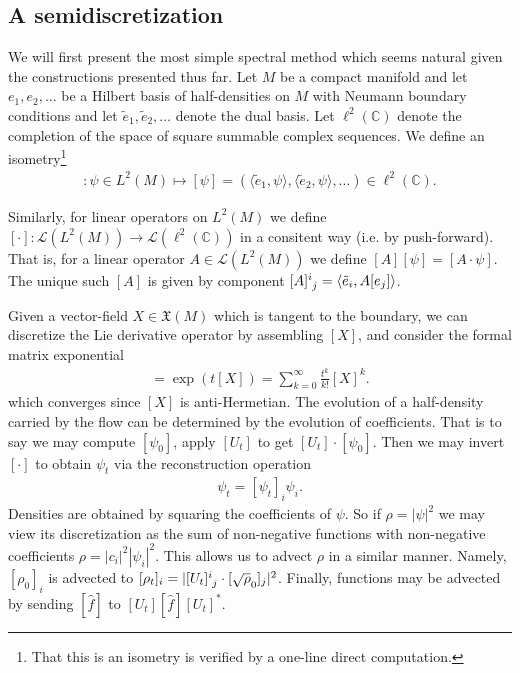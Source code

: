 \documentclass[12pt]{amsart}
\begin{document}
\subsection{A semidiscretization}
\label{sec:semi_discretization}

We will first present the most simple spectral method
which seems natural given the constructions presented thus far.
Let $M$ be a compact manifold and let
$e_1,e_2,\dots$ be a Hilbert basis of half-densities
on $M$ with Neumann boundary conditions
and let $\tilde{e}_1,\tilde{e}_2,\dots$ denote the dual basis.
Let $\ell^2( \mathbb{C})$ denote the completion of the space of square summable complex sequences.
We define an isometry\footnote{That this is an isometry is verified by a one-line direct computation.}
\begin{align*}
  [\cdot ] : \psi \in L^2(M) \mapsto [\psi] = ( \langle \tilde{e}_1 , \psi \rangle, \langle \tilde{e}_2, \psi \rangle, \dots ) \in \ell^2( \mathbb{C}).
\end{align*}

Similarly, for linear operators on $L^2(M)$ we define $[\cdot ]: \mathcal{L}( L^2(M) ) \to \mathcal{L}( \ell^2( \mathbb{C}) )$ in a consitent way (i.e. by push-forward).
That is, for a linear operator $A \in \mathcal{L}( L^2 (M))$ we define $[A] [\psi] = [A \cdot \psi]$.
The unique such $[A]$ is given by component $[A]\indices{^i_j} = \langle \tilde{e}_i , A[ e_j] \rangle$.

Given a vector-field $X \in \mathfrak{X}(M)$ which is tangent to the
boundary, we can discretize the Lie derivative operator by assembling
$[X]$, and consider the formal matrix exponential
\begin{align*}
  [U_t] = \exp( t[X] ) = \sum_{k=0}^{\infty} \frac{t^k}{k!} [X]^k.
\end{align*}
which converges since $[X]$ is anti-Hermetian.
The evolution of a half-density carried by the flow can be determined by the evolution of coefficients.
That is to say we may compute $[\psi_0]$, apply $[U_t]$ to get $[U_t] \cdot [\psi_0]$.
Then we may invert $[\cdot]$ to obtain $\psi_t$ via the reconstruction operation
\begin{align*}
  \psi_t = [\psi_t]_i \psi_i.
\end{align*}
Densities are obtained by squaring the coefficients of $\psi$.
So if $\rho = |\psi|^2$ we may view its discretization as the sum of non-negative functions with non-negative coefficients $\rho = |c_i|^2 |\psi_i|^2$.
This allows us to advect $\rho$ in a similar manner.
Namely, $[\rho_0]_i$ is advected to $[\rho_t]_i = | [U_t]\indices{^i_j} \cdot [\sqrt{\rho}_0]_j |^2$.
Finally, functions may be advected by sending $[\hat{f}]$ to $[U_t] [\hat{f}] [U_t]^*$.
\end{document}
